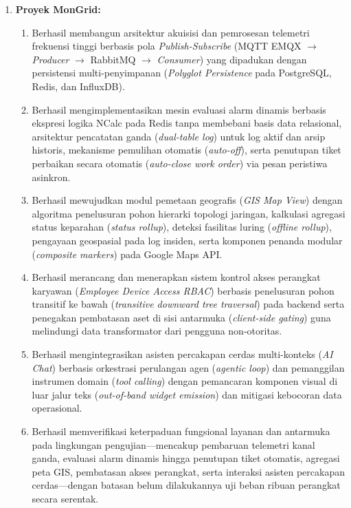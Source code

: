 \begin{enumerate}[label=\arabic*., leftmargin=*, itemsep=0pt]
  \item \textbf{Proyek MonGrid:}
  \begin{enumerate}[label=\alph*., leftmargin=*, itemsep=0pt]
    \item Berhasil membangun arsitektur akuisisi dan pemrosesan telemetri frekuensi tinggi berbasis pola \textit{Publish-Subscribe} (MQTT EMQX $\rightarrow$ \textit{Producer} $\rightarrow$ RabbitMQ $\rightarrow$ \textit{Consumer}) yang dipadukan dengan persistensi multi-penyimpanan (\textit{Polyglot Persistence} pada PostgreSQL, Redis, dan InfluxDB).
    \item Berhasil mengimplementasikan mesin evaluasi alarm dinamis berbasis ekspresi logika NCalc pada Redis tanpa membebani basis data relasional, arsitektur pencatatan ganda (\textit{dual-table log}) untuk log aktif dan arsip historis, mekanisme pemulihan otomatis (\textit{auto-off}), serta penutupan tiket perbaikan secara otomatis (\textit{auto-close work order}) via pesan peristiwa asinkron.
    \item Berhasil mewujudkan modul pemetaan geografis (\textit{GIS Map View}) dengan algoritma penelusuran pohon hierarki topologi jaringan, kalkulasi agregasi status keparahan (\textit{status rollup}), deteksi fasilitas luring (\textit{offline rollup}), pengayaan geospasial pada log insiden, serta komponen penanda modular (\textit{composite markers}) pada Google Maps API.
    \item Berhasil merancang dan menerapkan sistem kontrol akses perangkat karyawan (\textit{Employee Device Access RBAC}) berbasis penelusuran pohon transitif ke bawah (\textit{transitive downward tree traversal}) pada backend serta penegakan pembatasan aset di sisi antarmuka (\textit{client-side gating}) guna melindungi data transformator dari pengguna non-otoritas.
    \item Berhasil mengintegrasikan asisten percakapan cerdas multi-konteks (\textit{AI Chat}) berbasis orkestrasi perulangan agen (\textit{agentic loop}) dan pemanggilan instrumen domain (\textit{tool calling}) dengan pemancaran komponen visual di luar jalur teks (\textit{out-of-band widget emission}) dan mitigasi kebocoran data operasional.
    \item Berhasil memverifikasi keterpaduan fungsional layanan dan antarmuka pada lingkungan pengujian—mencakup pembaruan telemetri kanal ganda, evaluasi alarm dinamis hingga penutupan tiket otomatis, agregasi peta GIS, pembatasan akses perangkat, serta interaksi asisten percakapan cerdas—dengan batasan belum dilakukannya uji beban ribuan perangkat secara serentak.
  \end{enumerate}


\end{enumerate}
